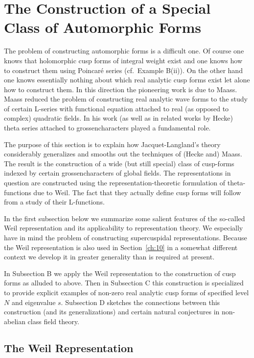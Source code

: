 \chapter{The Construction of a Special Class of Automorphic Forms}

\label{ch:7}
\label{ch:7}

The problem of constructing automorphic forms is a difficult one. Of course one knows that holomorphic cusp forms of integral weight exist and one knows how to construct them using Poincar\'e series (cf.\ Example B(ii)). On the other hand one knows essentially nothing about which real analytic cusp forms exist let alone how to construct them. In this direction the pioneering work is due to Maass. Maass reduced the problem of constructing real analytic wave forms to the study of certain L-series with functional equation attached to real (as opposed to complex) quadratic fields. In his work (as well as in related works by Hecke) theta series attached to grossencharacters played a fundamental role.

The purpose of this section is to explain how Jacquet-Langland's theory considerably generalizes and smooths out the techniques of (Hecke and) Maass. The result is the construction of a wide (but still special) class of cusp-forms indexed by certain grossencharacters of global fields. The representations in question are constructed using the representation-theoretic formulation of theta-functions due to Weil. The fact that they actually define cusp forms will follow from a study of their L-functions.

In the first subsection below we summarize some salient features of the so-called Weil representation and its applicability to representation theory. We especially have in mind the problem of constructing supercuspidal representations. Because the Weil representation is also used in Section~\ref{ch:10} in a somewhat different context we develop it in greater generality than is required at present.

In Subsection B we apply the Weil representation to the construction of cusp forms as alluded to above. Then in Subsection C this construction is specialized to provide explicit examples of non-zero real analytic cusp forms of specified level $N$ and eigenvalue $s$. Subsection D sketches the connections between this construction (and its generalizations) and certain natural conjectures in non-abelian class field theory.

\section{The Weil Representation}\label{sec:7a}

